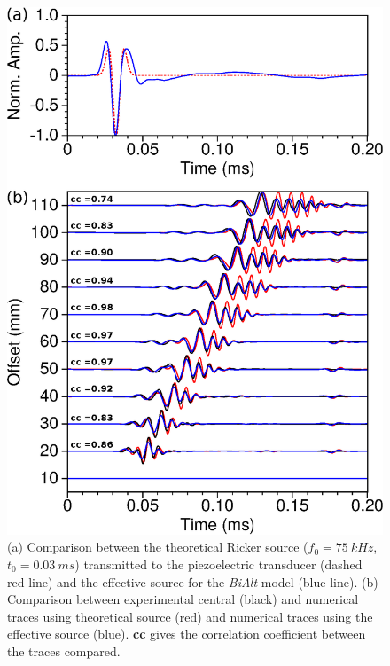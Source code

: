 \documentclass[extra,mreferee]{gji}
\newcommand{\bialt}{\textit{BiAlt} }
\begin{document}
\clearpage
\newpage

\begin{figure}
\centering
\includegraphics[width=0.50\columnwidth]{Fig/Fig11.eps}
\caption{(a) Comparison between the theoretical Ricker source ($f_{0}=75\ kHz$, $t_{0}=0.03\ ms$) transmitted to the piezoelectric transducer (dashed red line) and the effective source for the \bialt model (blue line). (b) Comparison between experimental central (black) and numerical traces using theoretical source (red) and numerical traces using the effective source (blue). \textbf{cc} gives the correlation coefficient between the traces compared.}
\label{Fig:Fig11}
\end{figure}
\end{document}
